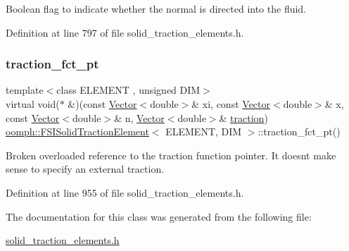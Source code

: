Boolean flag to indicate whether the normal is directed into the fluid. 



Definition at line 797 of file solid\+\_\+traction\+\_\+elements.\+h.

\mbox{\label{classoomph_1_1FSISolidTractionElement_a4d1acd383b92177b86bce888e48a67e8}} 
\subsubsection{\texorpdfstring{traction\+\_\+fct\+\_\+pt}{traction\_fct\_pt}}
{\footnotesize\ttfamily template$<$class E\+L\+E\+M\+E\+NT , unsigned D\+IM$>$ \\
virtual void($\ast$ \&)(const \hyperlink{classoomph_1_1Vector}{Vector}$<$double$>$\& xi, const \hyperlink{classoomph_1_1Vector}{Vector}$<$double$>$\& x, const \hyperlink{classoomph_1_1Vector}{Vector}$<$double$>$\& n, \hyperlink{classoomph_1_1Vector}{Vector}$<$double$>$\& \hyperlink{classoomph_1_1SolidTractionElement_ab00a3429962eb33612054e82095f8082}{traction}) \hyperlink{classoomph_1_1FSISolidTractionElement}{oomph\+::\+F\+S\+I\+Solid\+Traction\+Element}$<$ E\+L\+E\+M\+E\+NT, D\+IM $>$\+::traction\+\_\+fct\+\_\+pt()\hspace{0.3cm}{\ttfamily [inline]}}



Broken overloaded reference to the traction function pointer. It doesn\textquotesingle{}t make sense to specify an external traction. 



Definition at line 955 of file solid\+\_\+traction\+\_\+elements.\+h.



The documentation for this class was generated from the following file\+:\begin{DoxyCompactItemize}
\item 
\hyperlink{solid__traction__elements_8h}{solid\+\_\+traction\+\_\+elements.\+h}\end{DoxyCompactItemize}
